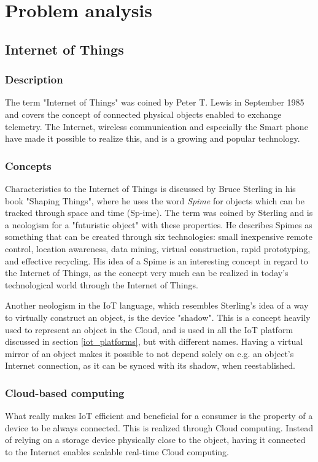 \section{Problem analysis}
\subsection{Internet of Things}
\subsubsection{Description}
The term "Internet of Things" was coined by Peter T. Lewis in September 1985 and covers the concept of connected physical objects enabled to exchange telemetry. The Internet, wireless communication and especially the Smart phone have made it possible to realize this, and is a growing and popular technology. 

\subsubsection{Concepts}
Characteristics to the Internet of Things is discussed by Bruce Sterling in his book "Shaping Things", where he uses the word \textit{Spime} for objects which can be tracked through space and time (Sp-ime). The term was coined by Sterling and is a neologism for a "futuristic object" with these properties. He describes Spimes as something that can be created through six technologies: small inexpensive remote control, location awareness, data mining, virtual construction, rapid prototyping, and effective recycling. His idea of a Spime is an interesting concept in regard to the Internet of Things, as the concept very much can be realized in today's technological world through the Internet of Things.

Another neologism in the IoT language, which resembles Sterling's idea of a way to virtually construct an object, is the device "shadow". This is a concept heavily used to represent an object in the Cloud, and is used in all the IoT platform discussed in section \ref{iot_platforms}, but with different names. Having a virtual mirror of an object makes it possible to not depend solely on e.g. an object's Internet connection, as it can be synced with its shadow, when reestablished. 

\subsubsection{Cloud-based computing}
What really makes IoT efficient and beneficial for a consumer is the property of a device to be always connected. This is realized through Cloud computing. Instead of relying on a storage device physically close to the object, having it connected to the Internet enables scalable real-time Cloud computing. 


